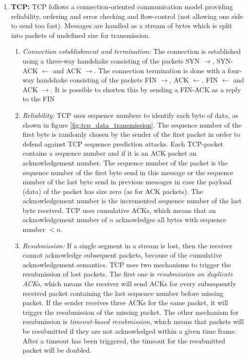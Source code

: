 \begin{enumerate}
      \item \textbf{\acf{TCP}:} \ac{TCP} follows a connection-oriented communication model providing reliability, ordering and error checking and flow-control (not allowing one side to send too fast). Messages are handled as a stream of bytes which is split into packets of undefined size for transmission.
            \begin{enumerate}
                  \item \textit{Connection establishment and termination:} The connection is established using a three-way handshake consisting of the packets SYN $\rightarrow$, SYN-ACK $\leftarrow$ and ACK $\rightarrow$. The connection termination is done with a four-way handshake consisting of the packets FIN $\rightarrow$, ACK $\leftarrow$, FIN $\leftarrow$ and ACK $\rightarrow$. It is possible to shorten this by sending a FIN-ACK as a reply to the FIN
                  \item \textit{Reliability:} \ac{TCP} uses sequence numbers to identify each byte of data, as shown in figure \ref{fig:tcp_data_transmission}. The sequence number of the first byte is randomly chosen by the sender of the first packet in order to defend against TCP sequence prediction attacks. Each \ac{TCP}-packet contains a sequence number and \textendash{} if it is an ACK packet \textendash{} an acknowledgement number. The sequence number of the packet is the sequence number of the first byte send in this message or the sequence number of the last byte send in previous messages in case the payload (data) of the packet has size zero (as for ACK packets). The acknowledgement number is the incremented sequence number of the last byte received. TCP uses cumulative ACKs, which means that an acknowledgement number of $n$ acknowledges all bytes with sequence number $< n$.
                  \item \textit{Resubmission:} If a single segment in a stream is lost, then the receiver cannot acknowledge subsequent packets, because of the cumulative acknowledgement semantics. TCP uses two mechanisms to trigger the resubmission of lost packets. The first one is \textit{resubmission on duplicate ACKs}, which means the receiver will send ACKs for every subsequently received packet containing the last sequence number before missing packet. If the sender receives three ACKs for the same packet, it will trigger the resubmission of the missing packet. The other mechanism for resubmission is \textit{timeout-based resubmission}, which means that packets will be resubmitted if they are not acknowledged within a given time frame. After a timeout has been triggered, the timeout for the resubmitted packet will be doubled.

\end{enumerate}
\end{enumerate}
